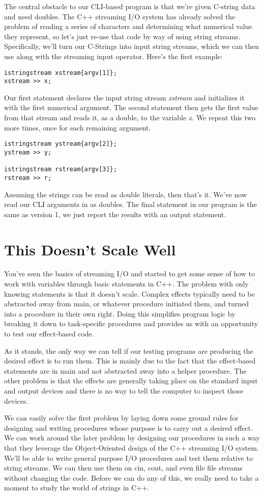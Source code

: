 \documentclass[]{tufte-handout}
\begin{document}
The central obstacle to our CLI-based program is that we're given C-string data and need doubles. The C++ streaming I/O system has already solved the problem of reading a series of characters and determining what numerical value they represent, so let's just re-use that code by way of using string streams. Specifically, we'll turn our C-Strings into input string streams, which we can then use along with the streaming input operator. Here's the first example:
\begin{verbatim}
istringstream xstream{argv[1]};
xstream >> x;
\end{verbatim}
Our first statement declares the input string stream \textit{xstream} and initializes it with the first numerical argument.  The second statement then gets the first value from that stream and reads it, as a double, to the variable \textit{x}. We repeat this two more times, once for each remaining argument.
\begin{verbatim}
istringstream ystream{argv[2]};
ystream >> y;

istringstream rstream{argv[3]};
rstream >> r;
\end{verbatim}
Assuming the strings can be read as double literals, then that's it.  We've now read our CLI arguments in as doubles. The final statement in our program is the same as version 1, we just report the results with an output statement.  

\section{This Doesn't Scale Well}

You've seen the basics of streaming I/O and started to get some sense of how to work with variables through basic statements in C++. The problem with only knowing statements is that it doesn't scale. Complex effects typically need to be abstracted away from main, or whatever procedure initiated them, and turned into a procedure in their own right. Doing this simplifies program logic by breaking it down to task-specific procedures and provides us with an opportunity to test our effect-based code. 

As it stands, the only way we can tell if our testing programs are producing the desired effect is to run them.  This is mainly due to the fact that the effect-based statements are in main and not abstracted away into a helper procedure. The other problem is that the effects are generally taking place on the standard input and output devices and there is no way to tell the computer to inspect those devices. 

We can easily solve the first problem by laying down some ground rules for designing and writing procedures whose purpose is to carry out a desired effect. We can work around the later problem by designing our procedures in such a way that they leverage the Object-Oriented design of the C++ streaming I/O system. We'll be able to write general purpose I/O procedures and test them relative to string streams. We can then use them on cin, cout, and even file file streams without changing the code. Before we can do any of this, we really need to take a moment to study the world of strings in C++. 
\end{document}
